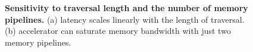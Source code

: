 \begin{figure}[!ht]
    \centering
    \caption[Sensitivity to traversal length and the number of memory pipelines]{\textbf{Sensitivity to traversal length and the number of memory pipelines.} (a) \pulse latency scales linearly with the length of traversal. (b) \pulse accelerator can saturate memory bandwidth with just two \pulse memory pipelines.}
\end{figure}
    

